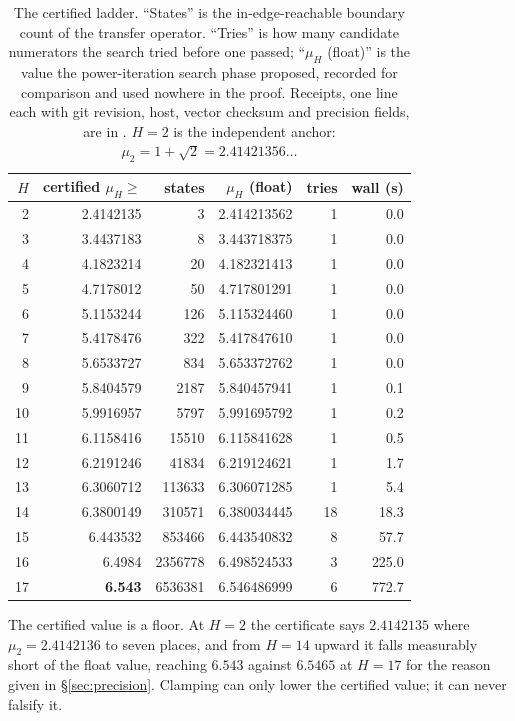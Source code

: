 \documentclass[11pt]{article}
\begin{document}
\begin{table}[H]
\centering\small
\begin{tabular}{r r r r r r}
\toprule
$H$ & certified $\mu_H \ge$ & states & $\mu_H$ (float) & tries & wall (s) \\
\midrule
 2 & 2.4142135 &         3 & 2.414213562 &  1 &   0.0 \\
 3 & 3.4437183 &         8 & 3.443718375 &  1 &   0.0 \\
 4 & 4.1823214 &        20 & 4.182321413 &  1 &   0.0 \\
 5 & 4.7178012 &        50 & 4.717801291 &  1 &   0.0 \\
 6 & 5.1153244 &       126 & 5.115324460 &  1 &   0.0 \\
 7 & 5.4178476 &       322 & 5.417847610 &  1 &   0.0 \\
 8 & 5.6533727 &       834 & 5.653372762 &  1 &   0.0 \\
 9 & 5.8404579 &      2187 & 5.840457941 &  1 &   0.1 \\
10 & 5.9916957 &      5797 & 5.991695792 &  1 &   0.2 \\
11 & 6.1158416 &     15510 & 6.115841628 &  1 &   0.5 \\
12 & 6.2191246 &     41834 & 6.219124621 &  1 &   1.7 \\
13 & 6.3060712 &    113633 & 6.306071285 &  1 &   5.4 \\
14 & 6.3800149 &    310571 & 6.380034445 & 18 &  18.3 \\
15 & 6.443532  &    853466 & 6.443540832 &  8 &  57.7 \\
16 & 6.4984    &   2356778 & 6.498524533 &  3 & 225.0 \\
17 & \textbf{6.543} & 6536381 & 6.546486999 &  6 & 772.7 \\
\bottomrule
\end{tabular}
\caption{The certified ladder. ``States'' is the in-edge-reachable boundary count
of the transfer operator. ``Tries'' is how many candidate numerators the search
tried before one passed; ``$\mu_H$ (float)'' is the value the power-iteration
search phase proposed, recorded for comparison and used nowhere in the proof. Receipts,
one line each with git revision, host, vector checksum and precision fields, are
in . $H=2$ is the independent anchor:
$\mu_2 = 1 + \sqrt2 = 2.41421356\dots$}
\label{tab:ladder}
\end{table}

The certified value is a floor. At $H = 2$ the certificate says $2.4142135$
where $\mu_2 = 2.4142136$ to seven places, and from $H = 14$ upward it falls
measurably short of the float value, reaching $6.543$ against $6.5465$ at
$H = 17$ for the reason given in \S\ref{sec:precision}. Clamping can only lower
the certified value; it can never falsify it.
\end{document}
